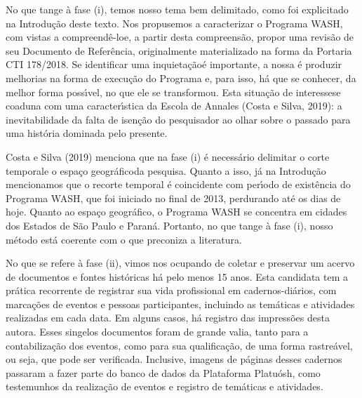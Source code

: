 \documentclass[
12pt,		%
openright,	%
twoside,  %
a4paper,			%
chapter=TITLE,		%
english,			%
french,				%
spanish,			%
brazil				%
]{USPSC-classe/USPSC}
\begin{document}
No que tange \`a fase (i), temos nosso tema bem delimitado, como foi explicitado na Introdu\c{c}\~ao deste texto. Nos propusemos a caracterizar o Programa WASH, com vistas a \textquotedbl compreend\^e-lo\textquotedbl  e, a partir desta compreens\~ao, propor uma revis\~ao de seu Documento de Refer\^encia, originalmente materializado na forma da Portaria CTI 178/2018. Se \textquotedbl identificar uma inquieta\c{c}\~ao\textquotedbl  \'e importante, a nossa \'e produzir melhorias na forma de execu\c{c}\~ao do Programa e, para isso, h\'a que se conhecer, da melhor forma poss\'{\i}vel, no que ele se transformou. Esta situa\c{c}\~ao de \textquotedbl interesse\textquotedbl  se coaduna com uma caracter\'{\i}stica da Escola de Annales  (Costa e Silva, 2019): \textquotedbl a inevitabilidade da falta de isen\c{c}\~ao do pesquisador ao olhar sobre o passado para uma hist\'oria dominada pelo presente\textquotedbl .










Costa e Silva (2019) menciona que na fase (i) \'e necess\'ario delimitar o \textquotedbl corte temporal\textquotedbl  e o \textquotedbl espa\c{c}o geogr\'afico\textquotedbl  da pesquisa.  Quanto a isso, j\'a na Introdu\c{c}\~ao mencionamos que o recorte temporal \'e coincidente com per\'{\i}odo de exist\^encia do Programa WASH, que foi iniciado no final de 2013, perdurando at\'e os dias de hoje. Quanto ao espa\c{c}o geogr\'afico, o Programa WASH se concentra em cidades dos Estados de S\~ao Paulo e Paran\'a. Portanto, no que tange \`a fase (i), nosso m\'etodo est\'a coerente com o que preconiza a literatura.










No que se refere \`a fase (ii), vimos nos ocupando de coletar e preservar um acervo de documentos e fontes hist\'oricas h\'a pelo menos 15 anos. Esta candidata tem a pr\'atica recorrente de registrar sua vida profissional em cadernos-di\'arios, com marca\c{c}\~oes de eventos e pessoas participantes, incluindo as tem\'aticas e atividades realizadas em cada data. Em alguns casos, h\'a registro das impress\~oes desta autora. Esses singelos documentos foram de grande valia, tanto para a contabiliza\c{c}\~ao dos eventos, como para sua qualifica\c{c}\~ao, de uma forma rastre\'avel, ou seja, que pode ser verificada. Inclusive, imagens de p\'aginas desses cadernos passaram a fazer parte do banco de dados da Plataforma Platu\'osh, como testemunhos da realiza\c{c}\~ao de eventos e registro de tem\'aticas e atividades.
\end{document}
